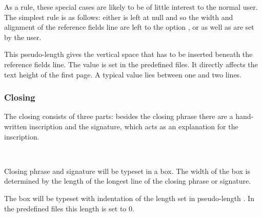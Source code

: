 As a rule, these special cases are likely to be of little interest to
the normal user. The simplest rule is as follows: either
 is left at null and so the width and alignment of
the reference fields line are left to the option , or
 as well as  are set by the user.
%
%
%


\begin{Declaration}
\end{Declaration}
%
This pseudo-length gives the vertical space that has to be inserted
beneath the reference fields line. The value is set in the predefined
 files. It directly affects the text height of the first
page. A typical value lies between one and two lines.
%
%
%
%


\subsubsection{Closing}
\label{sec:scrlttr2-experts.closing}

The closing consists of three parts: besides the closing phrase there
are a hand-written inscription and the signature, which acts as an
explanation for the inscription.

\begin{Declaration}
  \\
\end{Declaration}
%
%
Closing phrase and signature will be typeset in a box. The width of
the box is determined by the length of the longest line of the closing
phrase or signature.

The box will be typeset with indentation of the length set in
pseudo-length . In the predefined  files
this length is set to 0.

